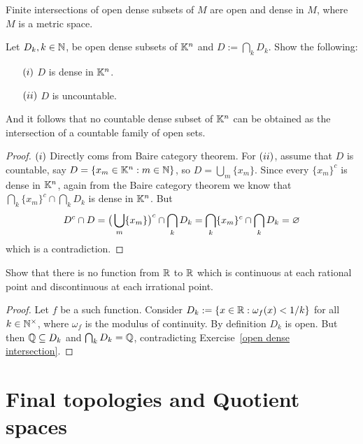 \begin{exercise}
Finite intersections of open dense subsets of $M$ are open and dense in $M$, where $M$ is a metric space.
\end{exercise}
\begin{exercise}\label{open dense intersection}
Let $D_k,k\in\mathbb{N}$, be open dense subsets of $\mathbb{K}^n$ and $D:=\bigcap_kD_k$. Show the following:
\begin{itemize}
\item[$(\rmnum{1})$]$D$ is dense in $\mathbb{K}^n$.
\item[$(\rmnum{2})$]$D$ is uncountable.
\end{itemize}
And it follows that no countable dense subset of $\mathbb{K}^n$ can be obtained as the intersection of a countable family of open sets.
\end{exercise}
\begin{proof}
$(\rmnum{1})$ Directly coms from Baire category theorem. For $(\rmnum{2})$, assume that $D$ is countable, say $D=\{x_m\in\mathbb{K}^n:m\in\mathbb{N}\}$, so $D=\bigcup_m\{x_m\}$. Since every $\{x_m\}^c$ is dense in $\mathbb{K}^n$, again from the Baire category theorem we know that $\bigcap_k\{x_m\}^c\cap\bigcap_{k}D_k$ is dense in $\mathbb{K}^n$. But 
\[D^c\cap D=\big(\bigcup_m\{x_m\}\big)^c\cap\bigcap_{k}D_k=\bigcap_k\{x_m\}^c\cap\bigcap_{k}D_k=\varnothing\]
which is a contradiction.
\end{proof}
\begin{exercise}
Show that there is no function from $\mathbb{R}$ to $\mathbb{R}$ which is continuous at each rational point
and discontinuous at each irrational point.
\end{exercise}
\begin{proof}
Let $f$ be a such function. Consider $D_k:=\{x\in\mathbb{R}:\omega_f(x)<1/k\}$ for all $k\in\mathbb{N}^{\times}$, where $\omega_f$ is the modulus of continuity. By definition $D_k$ is open. But then $\mathbb{Q}\subseteq D_k$ and $\bigcap_{k}D_k=\mathbb{Q}$, contradicting Exercise~\ref{open dense intersection}.
\end{proof}
\section{Final topologies and Quotient spaces}
